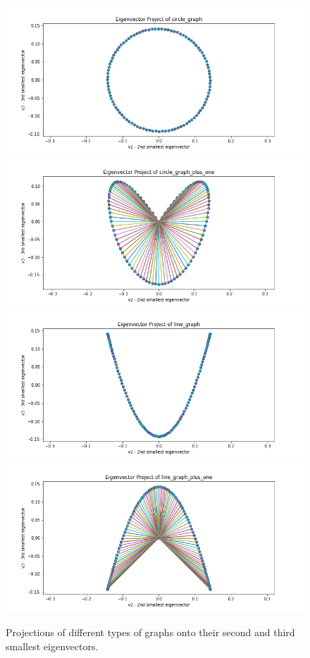 \documentclass[12pt]{article}
\begin{document}
\begin{enumerate}[label=(\alph*)]
      \begin{figure}[!ht]
        \centering
        \includegraphics[scale=0.3]{figures/eignevector_projection_circle_graph.png}
        \includegraphics[scale=0.3]{figures/eignevector_projection_circle_graph_plus_one.png}
        \includegraphics[scale=0.3]{figures/eignevector_projection_line_graph.png}
        \includegraphics[scale=0.3]{figures/eignevector_projection_line_graph_plus_one.png}
        \caption{Projections of different types of graphs onto their second and third smallest eigenvectors.}
        \label{fig:projections}
      \end{figure}


\end{enumerate}
\end{document}
